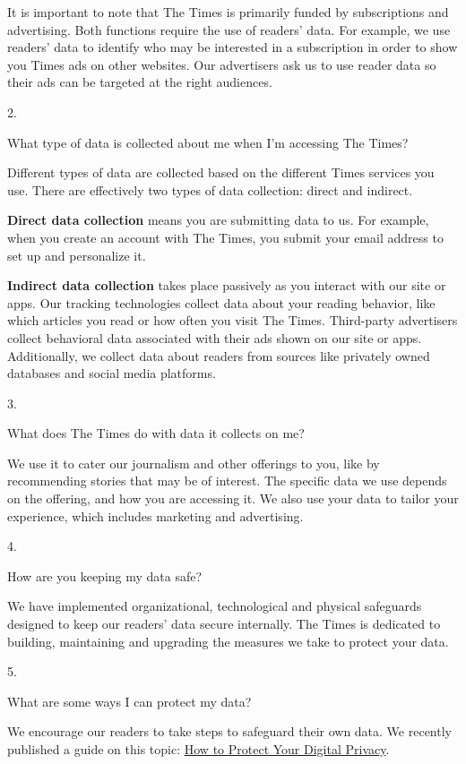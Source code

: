 It is important to note that The Times is primarily funded by
subscriptions and advertising. Both functions require the use of
readers' data. For example, we use readers' data to identify who may be
interested in a subscription in order to show you Times ads on other
websites. Our advertisers ask us to use reader data so their ads can be
targeted at the right audiences.

2.

What type of data is collected about me when I'm accessing The Times?

Different types of data are collected based on the different Times
services you use. There are effectively two types of data collection:
direct and indirect.

\textbf{Direct data collection} means you are submitting data to us. For
example, when you create an account with The Times, you submit your
email address to set up and personalize it.

\textbf{Indirect data collection} takes place passively as you interact
with our site or apps. Our tracking technologies collect data about your
reading behavior, like which articles you read or how often you visit
The Times. Third-party advertisers collect behavioral data associated
with their ads shown on our site or apps. Additionally, we collect data
about readers from sources like privately owned databases and social
media platforms.

3.

What does The Times do with data it collects on me?

We use it to cater our journalism and other offerings to you, like by
recommending stories that may be of interest. The specific data we use
depends on the offering, and how you are accessing it. We also use your
data to tailor your experience, which includes marketing and
advertising.

4.

How are you keeping my data safe?

We have implemented organizational, technological and physical
safeguards designed to keep our readers' data secure internally. The
Times is dedicated to building, maintaining and upgrading the measures
we take to protect your data.

5.

What are some ways I can protect my data?

We encourage our readers to take steps to safeguard their own data. We
recently published a guide on this topic:
\href{https://www.nytimes.com/guides/privacy-project/how-to-protect-your-digital-privacy}{How
to Protect Your Digital Privacy}.


